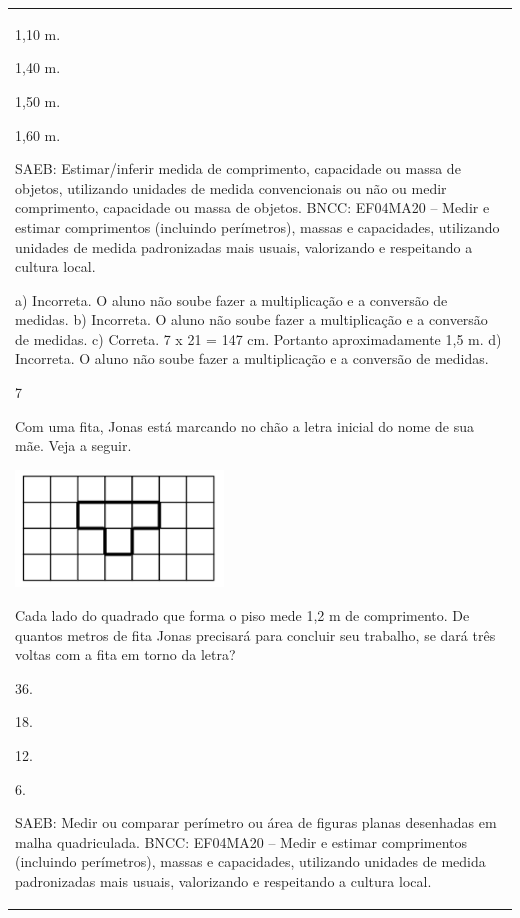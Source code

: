 \begin{mdframed}[linewidth=2pt,linecolor=salmao,roundcorner=2pt]
\begin{escolha}
{{{\begin{longtable}[]{@{}l@{}}
\begin{itemize}
{\begin{escolha}
\item
  1,10 m.
\item
  1,40 m.
\item
  1,50 m.
\item
  1,60 m.
\end{escolha}

SAEB: Estimar/inferir medida de comprimento, capacidade ou
massa de objetos, utilizando unidades de medida convencionais ou não ou
medir comprimento, capacidade ou massa de objetos.
BNCC: EF04MA20 -- Medir e estimar comprimentos (incluindo perímetros), massas e capacidades, utilizando
unidades de medida padronizadas mais usuais, valorizando e respeitando a cultura local.

a) Incorreta. O aluno não soube fazer a multiplicação e a conversão de medidas.
b) Incorreta. O aluno não soube fazer a multiplicação e a conversão de medidas.
c) Correta. 7 x 21 = 147 cm. Portanto aproximadamente 1,5 m.
d) Incorreta. O aluno não soube fazer a multiplicação e a conversão de medidas.

\num{7}

Com uma fita, Jonas está marcando no chão a letra inicial do nome de
sua mãe. Veja a seguir.

\includegraphics[width=2.17519in,height=1.22511in]{media/image155.png}

Cada lado do quadrado que forma o piso mede 1,2 m de
comprimento. De quantos metros de fita Jonas precisará para concluir seu
trabalho, se dará três voltas com a fita em torno da letra?

\begin{escolha}
\item
  36.
\item
  18.
\item
  12.
\item
  6.
\end{escolha}

SAEB: Medir ou comparar perímetro ou área de figuras planas
desenhadas em malha quadriculada.
BNCC: EF04MA20 -- Medir e estimar comprimentos (incluindo perímetros), massas e capacidades, utilizando
unidades de medida padronizadas mais usuais, valorizando e respeitando a cultura local.

}
\end{itemize}
\end{longtable}}}}
\end{escolha}
\end{mdframed}
